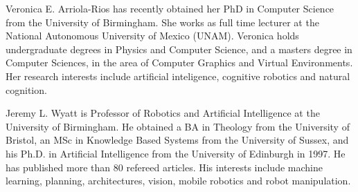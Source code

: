\documentclass[journal]{IEEEtran}
\begin{document}
\begin{IEEEbiography}{Veronica E. Arriola-Rios}
  has recently obtained her PhD in Computer Science from the University of Birmingham.
  She works as full time lecturer at the National Autonomous University of Mexico (UNAM).
  Veronica holds undergraduate degrees in Physics and Computer Science, and a masters degree in Computer Sciences, in the area of Computer Graphics and Virtual Environments.
  Her research interests include artificial inteligence, cognitive robotics and natural cognition.
\end{IEEEbiography}

\begin{IEEEbiography}{Jeremy L. Wyatt}
  is Professor of Robotics
  and Artificial Intelligence at the University of Birmingham. He
  obtained a BA in Theology from the University of Bristol, an MSc in
  Knowledge Based Systems from the University of Sussex, and his
  Ph.D. in Artificial Intelligence from the University of Edinburgh in
  1997. He has published more than 80 refereed articles. His interests
  include machine learning, planning, architectures, vision, mobile robotics and robot manipulation.
\end{IEEEbiography}
\end{document}

